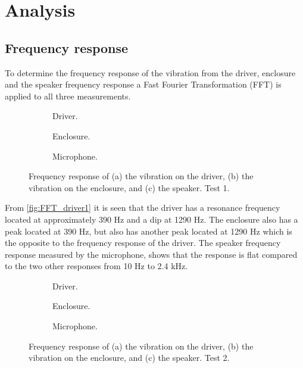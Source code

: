 \section{Analysis}

\subsection{Frequency response}

To determine the frequency response of the vibration from the driver, enclosure and the speaker frequency response a Fast Fourier Transformation (FFT) is applied to all three measurements.

\begin{figure}[H]
\centering
\begin{subfigure}[t]{0.37\textwidth}
	
	\caption{Driver.}
	\label{fig:FFT_driver1}
\end{subfigure}
\begin{subfigure}[t]{0.28\textwidth}
	
	\caption{Enclosure.}
	\label{fig:FFT_enclosure1}
\end{subfigure}
\begin{subfigure}[t]{0.32\textwidth}
	
	\caption{Microphone.}
	\label{fig:FFT_mic1}
\end{subfigure}
\caption{Frequency response of (a) the vibration on the driver, (b) the vibration on the enclosure, and (c) the speaker. Test 1.}
\label{fig:FFT1}
\end{figure}

From \autoref{fig:FFT_driver1} it is seen that the driver has a resonance frequency located at approximately 390 Hz and a dip at 1290 Hz. The enclosure also has a peak located at 390 Hz, but also has another peak located at 1290 Hz which is the opposite to the frequency response of the driver. The speaker frequency response measured by the microphone, shows that the response is flat compared to the two other responses from 10 Hz to 2.4 kHz.

\begin{figure}[H]
\centering
\begin{subfigure}[t]{0.37\textwidth}
	
	\caption{Driver.}
	\label{fig:FFT_driver10}
\end{subfigure}
\begin{subfigure}[t]{0.28\textwidth}
	
	\caption{Enclosure.}
	\label{fig:FFT_enclosure10}
\end{subfigure}
\begin{subfigure}[t]{0.32\textwidth}
	
	\caption{Microphone.}
	\label{fig:FFT_mic10}
\end{subfigure}
\caption{Frequency response of (a) the vibration on the driver, (b) the vibration on the enclosure, and (c) the speaker. Test 2.}
\label{fig:FFT1}
\end{figure}

